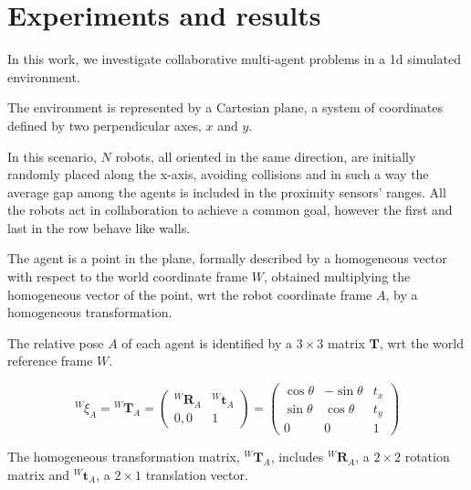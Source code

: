 \chapter{Experiments and results}
\label{chap:experiments}


In this work, we investigate collaborative multi-agent problems in a \gls{1d} 
simulated environment.

The environment is represented by a Cartesian plane, a system of coordinates
defined by two perpendicular axes, $x$ and $y$. 

In this scenario, $N$ robots, all oriented in the same direction, are initially 
randomly placed along the x-axis, avoiding collisions and in such a way the 
average gap among the agents is included in the proximity sensors' ranges. 
All the robots act in collaboration to achieve a common goal, however the first 
and last in the row behave like walls. %

The agent is a point in the plane, formally described by a homogeneous vector 
with respect to the world coordinate frame $W$, obtained multiplying the 
homogeneous vector of the point, \gls{wrt}  the robot coordinate frame 
$A$, by a homogeneous transformation. 

The relative pose $A$ of each agent is identified by a $3 \times 3$ matrix 
$\mathbf{T}$, \gls{wrt} the world reference frame $W$. 

\begin{Equation}[!htb]
	\centering
	\begin{equation}
	{^W\!\xi_A} = {^W\!\mathbf{T}_A} 
	=
	\begin{pmatrix}
	^W\!\mathbf{R}_A & ^W\!\mathbf{t}_A\\
	0, 0 & 1
	\end{pmatrix}
	=
	\begin{pmatrix}
	\cos \theta & - \sin \theta & t_x\\
	\sin \theta & \cos \theta & t_y\\
	0 & 0 & 1
	\end{pmatrix}
	\end{equation}
	\caption[Homogeneous transformation matrix.]{The homogeneous 
	transformation matrix, 	$^W\!\mathbf{T}_A$, includes $^W\!\mathbf{R}_A$, a 
	$2 \times 2$ rotation matrix and $^W\!\mathbf{t}_A$, a $2 \times 1$ 
	translation vector.}
	\label{eq:hommatrix}
\end{Equation}

